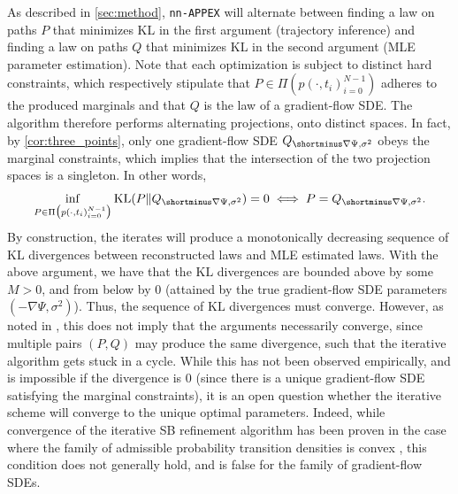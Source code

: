 \documentclass[twoside]{article}
\newcommand{\nappex}{\texttt{nn-APPEX}}
\begin{document}
As described in \cref{sec:method}, \nappex{} will alternate between finding a law on paths $P$ that minimizes KL in the first argument (trajectory inference) and finding a law on paths $Q$ that minimizes KL in the second argument (MLE parameter estimation). Note that each optimization is subject to distinct hard constraints, which respectively stipulate that $P \in \Pi(p(\cdot, t_i)_{i=0}^{N-1})$ adheres to the produced marginals and that $Q$ is the law of a gradient-flow SDE. The algorithm therefore performs alternating projections, onto distinct spaces. In fact, by \cref{cor:three_points}, only one gradient-flow SDE $Q_{\shortminus\nabla\Psi, \sigma^2}$ obeys the marginal constraints, which implies that the intersection of the two projection spaces is a singleton.  In other words,
$$\inf\limits_{\substack{
    P \in \Pi\bigl(p(\cdot, t_i)_{i=0}^{N-1}\bigr) 
}}
\mathrm{KL}(P \| Q_{\shortminus\nabla\Psi, \sigma^2}) = 0 \iff P = Q_{\shortminus\nabla\Psi, \sigma^2}.
$$
By construction, the iterates will produce a monotonically decreasing sequence of $\mathrm{KL}$ divergences between reconstructed laws and MLE estimated laws. With the above argument, we have that the $\mathrm{KL}$ divergences are bounded above by some $M>0$, and from below by $0$ (attained by the true gradient-flow SDE parameters $(-\nabla \Psi, \sigma^2)$). Thus, the sequence of $\mathrm{KL}$ divergences must converge. However, as noted in \citet{shen2025multi}, this does not imply that the arguments necessarily converge, since multiple pairs $(P,Q)$ may produce the same divergence, such that the iterative algorithm gets stuck in a cycle. While this has not been observed empirically, and is impossible if the divergence is $0$ (since there is a unique gradient-flow SDE satisfying the marginal constraints), it is an open question whether the iterative scheme will converge to the unique optimal parameters. Indeed, while convergence of the iterative SB refinement algorithm has been proven in the case where the family of admissible probability transition densities is convex \citep[Proposition 1]{shen2025multi}, this condition does not generally hold, and is false for the family of gradient-flow SDEs.
\end{document}
